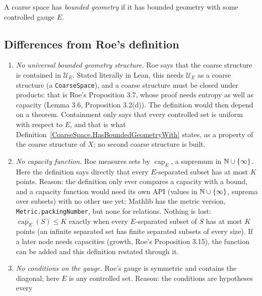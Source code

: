 \begin{definition}
  \label{CoarseSpace.HasBoundedGeometry}
  A coarse space has \emph{bounded geometry} if it has bounded geometry with some controlled
  gauge $E$.
\end{definition}

\subsection*{Differences from Roe's definition}

\begin{enumerate}
  \item \emph{No universal bounded geometry structure.} Roe says that the coarse structure is
        contained in $\mathcal{U}_E$. Stated literally in Lean, this needs $\mathcal{U}_E$ as
        a coarse structure (a \texttt{CoarseSpace}), and a coarse structure must be closed
        under products: that is Roe's Proposition 3.7, whose proof needs entropy as well as
        capacity (Lemma 3.6, Proposition 3.2(d)). The definition would then depend on a
        theorem. Containment only says that every controlled set is uniform with respect to
        $E$, and that is what Definition~\ref{CoarseSpace.HasBoundedGeometryWith} states, as a
        property of the coarse structure of $X$; no second coarse structure is built.
  \item \emph{No capacity function.} Roe measures sets by $\operatorname{cap}_E$, a supremum
        in $\mathbb{N} \cup \{\infty\}$. Here the definition says directly that every $E$-separated
        subset has at most $K$ points. Reason: the definition only ever compares a capacity
        with a bound, and a capacity function would need its own API (values in $\mathbb{N} \cup
        \{\infty\}$, suprema over subsets) with no other use yet; Mathlib has the metric
        version, \texttt{Metric.packingNumber}, but none for relations. Nothing is lost:
        $\operatorname{cap}_E(S) \le K$ exactly when every $E$-separated subset of $S$ has at
        most $K$ points (an infinite separated set has finite separated subsets of every
        size). If a later node needs capacities (growth, Roe's Proposition 3.15), the
        function can be added and this definition restated through it.
  \item \emph{No conditions on the gauge.} Roe's gauge is symmetric and contains the
        diagonal; here $E$ is any controlled set. Reason: the conditions are hypotheses every

\end{enumerate}
